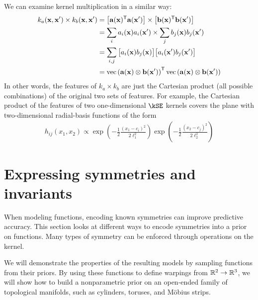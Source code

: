 We can examine kernel multiplication in a similar way:
%
\begin{align}
k_a({\bf{x}}, {\bf{x}}') \times k_b({\bf{x}}, {\bf{x}}')
& = \left[ {\bf{a}}({\bf{x}})^{\mathsf{T}} {\bf{a}}({\bf{x}}') \right] \times \left[ {\bf{b}}({\bf{x}})^{\mathsf{T}} {\bf{b}}({\bf{x}}') \right] \\
& = \sum_i a_i({\bf{x}}) a_i({\bf{x}}') \times \sum_j b_j({\bf{x}}) b_j({\bf{x}}') \\
& = \sum_{i,j} \big[ a_i({\bf{x}}) b_j({\bf{x}}) \big] \big[ a_i({\bf{x}}') b_j({\bf{x}}') \big] \\
& = \operatorname{vec} \left( { {\bf{a}}({\bf{x}}) \otimes {\bf{b}}({\bf{x}}') } \right) ^{\mathsf{T}} \operatorname{vec} \left( { {\bf{a}}({\bf{x}}) \otimes {\bf{b}}({\bf{x}}')} \right) 
\end{align}
%
In other words, the features of $k_a \times k_b$ are just the Cartesian product (all possible combinations) of the original two sets of features.
For example, the Cartesian product of the features of two one-dimensional $\kSE$ kernels covers the plane with two-dimensional radial-basis functions of the form
%
\begin{align}
h_{ij}(x_1, x_2) \propto \exp \left( -\frac{1}{2} \frac{(x_1 - c_i)^2}{2\ell_1^2} \right) \exp \left( -\frac{1}{2} \frac{(x_2 - c_j)^2}{2\ell_2^2} \right)
\end{align}





\section{Expressing symmetries and invariants}
\label{sec:expressing-symmetries}

\def\gswitch{G_\textnormal{swap}}

When modeling functions, encoding known symmetries can improve predictive accuracy. 
This section looks at different ways to encode symmetries into a prior on functions.
Many types of symmetry can be enforced through operations on the kernel.

We will demonstrate the properties of the resulting models by sampling functions from their priors.
By using these functions to define warpings from $\mathbb{R}^2 \to \mathbb{R}^3$, we will show how to build a nonparametric prior on an open-ended family of topological manifolds, such as cylinders, toruses, and M\"{o}bius strips.

